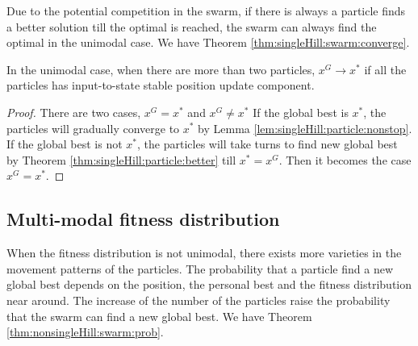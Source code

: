 Due to the potential competition in the swarm, if there is always a particle finds a better solution till the optimal is reached, the swarm can always find the optimal in the unimodal case.
We have Theorem \ref{thm:singleHill:swarm:converge}.

\begin{mythm}
\label{thm:singleHill:swarm:converge}
In the unimodal case, when there are more than two particles, $ x^{G} \rightarrow x^{*} $ if all the particles has input-to-state stable position update component.
\begin{proof}
There are two cases, $ x^{G} = x^{*} $ and $ x^{G} \not = x^{*} $
If the global best is $ x^{*} $, the particles will gradually converge to $ x^{*} $ by Lemma \ref{lem:singleHill:particle:nonstop}.
If the global best is not $ x^{*} $, the particles will take turns to find new global best by Theorem \ref{thm:singleHill:particle:better} till $ x^{*} = x^{G} $.
Then it becomes the case $ x^{G} = x^{*} $.
\end{proof}
\end{mythm}



\subsection{Multi-modal fitness distribution}

When the fitness distribution is not unimodal, there exists more varieties in the movement patterns of the particles.
The probability that a particle find a new global best depends on the position, the personal best and the fitness distribution near around.
The increase of the number of the particles raise the probability that the swarm can find a new global best.
We have Theorem \ref{thm:nonsingleHill:swarm:prob}.

